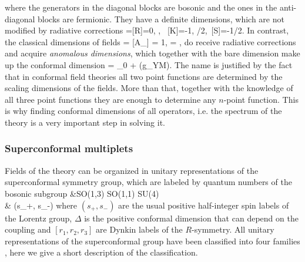 \)
\eeq
where the generators in the diagonal blocks are bosonic and the ones in the anti-diagonal blocks are fermionic.
They have a definite dimensions, which are not modified by radiative corrections
\beq
	[D]=[R]=0\;, \;, \ [K]=-1\;, /2\;,\  [S]=-1/2\;.
\eeq
In contrast, the classical dimensions of fields
\beq
	[\Phi^I] = [A_\mu] = 1\;, \quad [\psi_a] = ,
\eeq
do receive radiative corrections and acquire \emph{anomalous dimensions}, which together with the bare dimension make up the conformal dimension
\beq
	\Delta = \Delta_0 + \gamma(g_{YM}).
\eeq
The name is justified by the fact that in conformal field theories all two point functions are determined by the scaling dimensions of the fields. 
More than that, together with the knowledge of all three point functions they are enough to determine any $n$-point function. 
This is why finding conformal dimensions of all operators, i.e. the spectrum of the theory is a very important step in solving it.

\subsubsection{Superconformal multiplets}

Fields of the theory can be organized in unitary representations of the superconformal symmetry group, which are labeled by quantum numbers of the bosonic subgroup
\beqa
	&SO(1,3) \times SO(1,1) \times SU(4) \nonumber \\
	&\quad \; (s_+, s_-) \quad \quad \Delta \quad \quad  [r_1, r_2, r_3]
\eeqa 
where $(s_+, s_-)$ are the usual positive half-integer spin labels of the Lorentz group, $\Delta$ is the positive conformal dimension that can depend on the coupling and $[r_1, r_2, r_3]$ are Dynkin labels of the $R$-symmetry.
All unitary representations of the superconformal group have been classified into four families \cite{Dobrev:1985ab,Dobrev:1985cd}, here we give a short description of the classification.
  
